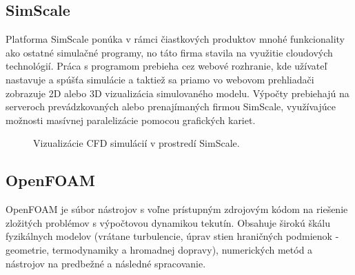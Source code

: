 \documentclass[]{tukediphc}
\begin{document}
\subsection{SimScale}

Platforma SimScale ponúka v rámci čiastkových produktov mnohé funkcionality ako ostatné simulačné programy, no táto firma stavila na využitie cloudových technológií. Práca s programom prebieha cez webové rozhranie, kde užívateľ nastavuje a spúšťa simulácie a taktiež sa priamo vo webovom prehliadači zobrazuje 2D alebo 3D vizualizácia simulovaného modelu. Výpočty prebiehajú na serveroch prevádzkovaných alebo prenajímaných firmou SimScale, využívajúce možnosti masívnej paralelizácie pomocou grafických kariet.

\begin{figure}[!ht]
	\centering
	\qquad
	\caption{Vizualizácie CFD simulácií v prostredí SimScale.}
\end{figure}

\subsection{OpenFOAM}

OpenFOAM je súbor nástrojov s voľne prístupným zdrojovým kódom na riešenie zložitých problémov s výpočtovou dynamikou tekutín. Obsahuje širokú škálu fyzikálnych modelov (vrátane turbulencie, úprav stien hraničných podmienok - geometrie, termodynamiky a hromadnej dopravy), numerických metód a nástrojov na predbežné a následné spracovanie.
\end{document}
